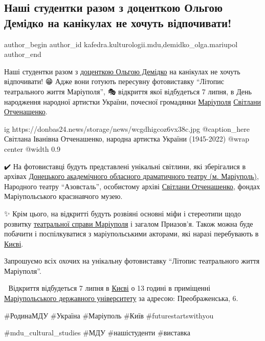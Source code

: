  
 
 
 
 
 
\subsection{Наші студентки разом з доценткою Ольгою Демідко на канікулах не хочуть відпочивати!}
\label{sec:30_06_2023.fb.kafedra.kulturologii.mdu.1.nashi_studentky_razom_iz_docent_demidko}
 
\ifcmt
 author_begin
   author_id kafedra.kulturologii.mdu,demidko_olga.mariupol
 author_end
\fi

Наші студентки разом з \href{\urlDemidkoIA}{доценткою Ольгою Демідко} на канікулах не хочуть
відпочивати! 😁 Адже вони готують пересувну фотовиставку \enquote{Літопис
театрального життя Маріуполя}, 🎭 відкриття якої відбудеться 7 липня, в День
народження народної артистки України, почесної громадянки
\href{\urlMariupolIA}{Маріуполя}
\href{\urlSvitlanaIvanivnaOtchenashenkoIA}{Світлани Отченашенко}.

\ifcmt
  ig https://donbas24.news/storage/news/wcgdhigcoz6vx38c.jpg
	@caption_here Світлана Іванівна Отченашенко, народна артистка України (1945-2022)
  @wrap center
  @width 0.9
\fi

✔️ На фотовиставці будуть представлені унікальні світлини, які зберігалися в
архівах \href{\urlMariupolDramTeatrIA}{Донецького академічного обласного драматичного театру (м. Маріуполь)},
Народного театру \enquote{Азовсталь}, особистому архіві \href{\urlSvitlanaIvanivnaOtchenashenkoIA}{Світлани Отченашенко}, фондах
Маріупольського краєзнавчого музею.

✨️ Крім цього, на відкритті будуть розвіяні основні міфи і стереотипи щодо
розвитку \href{\temaMariupolTeatrIA}{театральної справи Маріуполя} і загалом Приазов'я. Також можна буде
побачити і поспілкуватися з маріупольськими акторами, які наразі перебувають в
\href{\urlKyivIA}{Києві}.🥰

Запрошуємо всіх охочих на унікальну  фотовиставку \enquote{Літопис театрального життя
Маріуполя}. 🤗

🏤 Відкриття відбудеться 7 липня в \href{\urlKyivIA}{Києві} о 13 годині в приміщенні
\href{\urlMduIA}{Маріупольського державного університету} за адресою: Преображенська, 6.

\#РодинаМДУ  \#Україна \#Маріуполь \#Київ  \#futurestartswithyou

\#mdu\_cultural\_studies \#МДУ  \#нашістуденти \#виставка

